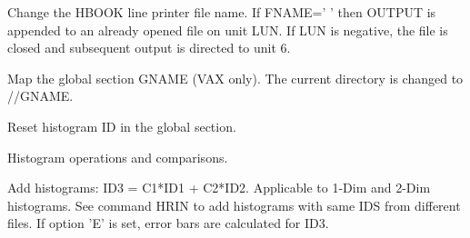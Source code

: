 \ENDCMD


\BEGARG
{}
\ENDARG

   \par
Change the HBOOK \DQUOTE{}line printer\DQUOTE{} file name.  If FNAME=' ' 
   then OUTPUT is appended to an already opened file on unit LUN.  If LUN is 
   negative, the file is closed and subsequent output is directed to unit 6.  

\ENDCMD


\BEGARG
{}
\ENDARG

   \par
Map the global section GNAME (VAX only).  The current directory is changed 
   to //GNAME.  

\ENDCMD


\BEGARG
{}
\ENDARG

   \par
Reset histogram ID in the global section.  

\ENDCMD
{}
\ifMENUtext
   \par
Histogram operations and comparisons.  


\fi


\BEGARG
{}
\ENDARG
{}
\DEFOPT{\EMPTY}{}
\ENDOPT

   \par
Add histograms: ID3 = C1*ID1 + C2*ID2.  Applicable to 1-Dim and 2-Dim 
   histograms.  See command HRIN to add histograms with same IDS from 
   different files.  If option 'E' is set, error bars are calculated for ID3.  

\ENDCMD


